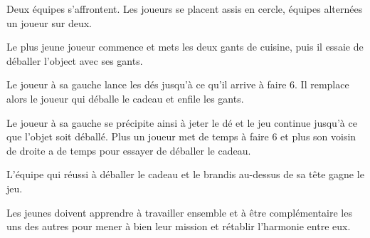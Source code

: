 \documentclass{grand-jeu}
\begin{document}
\begin{liste-materiel}
\end{liste-materiel}

\begin{regles}
Deux équipes s'affrontent. Les joueurs se placent assis en cercle, équipes alternées un joueur sur deux.

Le plus jeune joueur commence et mets les deux gants de cuisine, puis il essaie de déballer l'object avec ses gants.

Le joueur à sa gauche lance les dés jusqu'à ce qu'il arrive à faire 6. Il remplace alors le joueur qui déballe le cadeau et enfile les gants.

Le joueur à sa gauche se précipite ainsi à jeter le dé et le jeu continue jusqu'à ce que l'objet soit déballé. Plus un joueur met de temps à faire 6 et plus son voisin de droite a de temps pour essayer de déballer le cadeau.

L'équipe qui réussi à déballer le cadeau et le brandis au-dessus de sa tête gagne le jeu.
\end{regles}

\begin{imaginaire}
Les jeunes doivent apprendre à travailler ensemble et à être complémentaire les uns des autres pour mener à bien leur mission et rétablir l'harmonie entre eux.
\end{imaginaire}

\begin{moments-stop}
\end{moments-stop}
\end{document}
